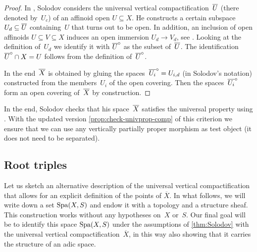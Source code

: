 \begin{proof}
     In \cite{Solodov-vertical-compactification}, Solodov considers the universal vertical compactification~$\overline{U}$ (there denoted by~$U_c$) of an affinoid open $U \subseteq X$.
    He constructs a certain subspace $U_d \subseteq \overline{U}$ containing~$U$ that turns out to be open.
    In addition, an inclusion of open affinoids $U \subseteq V \subseteq X$ induces an open immersion $U_d \to V_d$, see \cite[Lemma~3.27]{Solodov-vertical-compactification}.
    Looking at the definition of~$U_d$ we identify it with $\overline{U}^\circ$ as the subset of~$\overline{U}$. The identification $\overline{U}^\circ \cap X = U$ follows from the definition of~$\overline{U}^\circ$.

    In the end~$\overline{X}$ is obtained by gluing the spaces~$\overline{U_i}^\circ = U_{i,d}$ (in Solodov's notation) constructed from the members~$U_i$ of the open covering.
    Then the spaces~$\overline{U_i}^\circ$ form an open covering of~$\overline{X}$ by construction.   
\end{proof}


In the end, Solodov checks that his space~$\overline{X}$ satisfies the universal property using \cite[Lemma~3.19~iv)]{Solodov-vertical-compactification}.
With the updated version \cref{prop:check-univprop-comp} of this criterion we ensure that we can use any vertically partially proper morphism as test object (it does not need to be separated).

\subsection{Root triples} 
\label{sec:root-triples}

Let us sketch an alternative description of the universal vertical compactification that allows for an explicit definition of the points of $\overline{X}$.
In what follows, we will write down a set $\operatorname{Spa}(X,S)$ and endow it with a topology and a structure sheaf.
This construction works without any hypotheses on~$X$ or~$S$.
Our final goal will be to identify this space $\operatorname{Spa}(X,S)$ under the assumptions of \cref{thm:Solodov} with the universal vertical compactification~$\overline{X}$, in this way also showing that it carries the structure of an adic space. 

